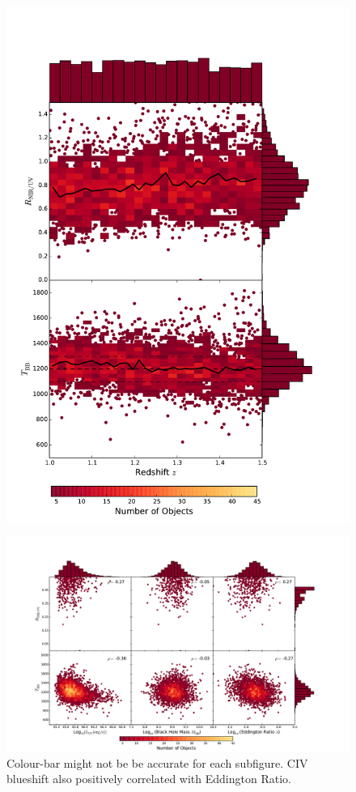 \begin{figure}
  \centering
  \includegraphics[width=\columnwidth]{figures/chapter06/ratio_bbt_z_v2}
  \caption{}
  \label{fig:}
\end{figure}

\begin{figure}
  \begin{minipage}{180mm}
  \includegraphics[width=\columnwidth]{figures/chapter06/correlations}
   \caption{Colour-bar might not be be accurate for each subfigure. CIV blueshift also positively correlated with Eddington Ratio.}
  \end{minipage}
\end{figure}

